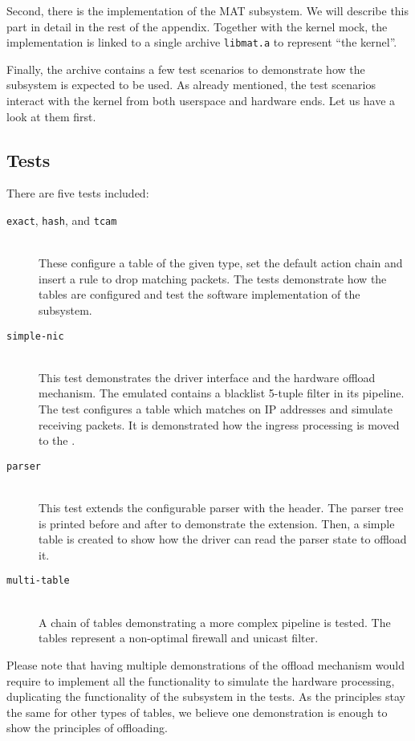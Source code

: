 Second, there is the implementation of the MAT subsystem. We will describe this
part in detail in the rest of the appendix. Together with the kernel mock, the
implementation is linked to a single archive \texttt{libmat.a} to represent
``the kernel''.

Finally, the archive contains a few test scenarios to demonstrate how the
subsystem is expected to be used. As already mentioned, the test scenarios
interact with the kernel from both userspace and hardware ends. Let us have
a look at them first.

\subsection{Tests}

There are five tests included:

\begin{description}
	\item[\texttt{exact}, \texttt{hash}, and \texttt{tcam}] \hfill \\
		These configure a table of the given type, set the default action chain
		and insert a rule to drop matching packets. The tests demonstrate how
		the tables are configured and test the software implementation of the
		subsystem.

	\item[\texttt{simple-nic}] \hfill \\
		This test demonstrates the driver interface and the hardware offload
		mechanism. The emulated  contains a blacklist 5-tuple filter in
		its pipeline. The test configures a table which matches on IP addresses
		and simulate receiving packets. It is demonstrated how the ingress
		processing is moved to the .

	\item[\texttt{parser}] \hfill \\
		This test extends the configurable parser with the  header.
		The parser tree is printed before and after to demonstrate the
		extension. Then, a simple table is created to show how the driver can
		read the parser state to offload it.

	\item[\texttt{multi-table}] \hfill \\
		A chain of tables demonstrating a more complex pipeline is tested.
		The tables represent a non-optimal firewall and unicast  filter.
\end{description}

\noindent Please note that having multiple demonstrations of the offload
mechanism would require to implement all the functionality to simulate the
hardware processing, duplicating the functionality of the subsystem in the
tests. As the principles stay the same for other types of tables, we believe
one demonstration is enough to show the principles of offloading.

